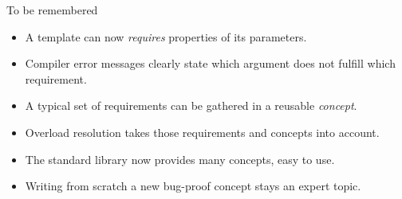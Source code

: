 \begin{frame}[fragile]
    \begin{block}{To be remembered}
      \begin{itemize}
      \item A template can now {\it requires} properties of its parameters.
      \item Compiler error messages clearly state which argument does not fulfill which requirement.
      \item A typical set of requirements can be gathered in a reusable {\it concept}.
      \item Overload resolution takes those requirements and concepts into account.
      \item The standard library now provides many concepts, easy to use.
      \item Writing from scratch a new bug-proof concept stays an expert topic.
      \end{itemize}
    \end{block}
\end{frame}

